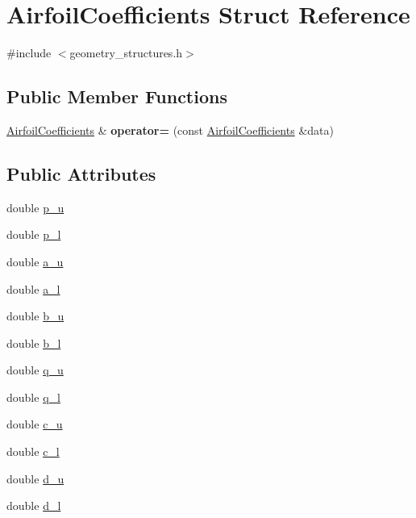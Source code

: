 \hypertarget{struct_airfoil_coefficients}{}\section{Airfoil\+Coefficients Struct Reference}
\label{struct_airfoil_coefficients}


{\ttfamily \#include $<$geometry\+\_\+structures.\+h$>$}

\subsection*{Public Member Functions}
\begin{DoxyCompactItemize}
\item 
\mbox{\label{struct_airfoil_coefficients_a36d875f89ad1d4b3404dfd6ff68c4660}} 
\hyperlink{struct_airfoil_coefficients}{Airfoil\+Coefficients} \& {\bfseries operator=} (const \hyperlink{struct_airfoil_coefficients}{Airfoil\+Coefficients} \&data)
\end{DoxyCompactItemize}
\subsection*{Public Attributes}
\begin{DoxyCompactItemize}
\item 
double \hyperlink{struct_airfoil_coefficients_a206b443b0e4e9ab91ec2d4f6570f687d}{p\+\_\+u}
\item 
double \hyperlink{struct_airfoil_coefficients_a1b195a3d499c8c050ccb05faeba65c9f}{p\+\_\+l}
\item 
double \hyperlink{struct_airfoil_coefficients_a7987ccdf3ca120dc8b96004cea2808c4}{a\+\_\+u}
\item 
double \hyperlink{struct_airfoil_coefficients_a9b8421053a97ec5dcf0bc1cc6dd7e2a1}{a\+\_\+l}
\item 
double \hyperlink{struct_airfoil_coefficients_aaa3ac1f49bc08223607d6ac4864baaae}{b\+\_\+u}
\item 
double \hyperlink{struct_airfoil_coefficients_ab6c29fe2ddce0a9b700d2a312791995a}{b\+\_\+l}
\item 
double \hyperlink{struct_airfoil_coefficients_a5d7aa2c02b9adfe9adcc86d2034f647f}{q\+\_\+u}
\item 
double \hyperlink{struct_airfoil_coefficients_aed33b0307a2bfcee3531fa2b240de679}{q\+\_\+l}
\item 
double \hyperlink{struct_airfoil_coefficients_a89bcbee889a35e1a184014b750195b37}{c\+\_\+u}
\item 
double \hyperlink{struct_airfoil_coefficients_aadd3f8683942976ea04c91b2afef18ad}{c\+\_\+l}
\item 
double \hyperlink{struct_airfoil_coefficients_ac294ea7a2fc38be4f61680e0e30290a1}{d\+\_\+u}
\item 
double \hyperlink{struct_airfoil_coefficients_abc1b88aeefdc2659a2585532a426279f}{d\+\_\+l}
\end{DoxyCompactItemize}



